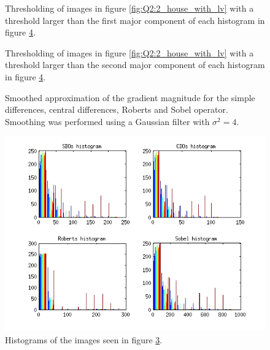 \begin{figure}[H]
	\centering
	\scalebox{0.9}{}
	\caption{Thresholding of images in figure \ref{fig:Q2:2_house_with_lv} with a threshold larger than the first major component of
	each histogram in figure \ref{fig:Q2:histogram_house_with_lv}.}
	\label{fig:Q2:threshold_house_1_with_lv}
\end{figure}

\begin{figure}[H]
	\centering
	\scalebox{0.9}{}
	\caption{Thresholding of images in figure \ref{fig:Q2:2_house_with_lv} with a threshold larger than the second major component of
	each histogram in figure \ref{fig:Q2:histogram_house_with_lv}.}
	\label{fig:Q2:threshold_house_2_with_lv}
\end{figure}


\begin{figure}[H]
	\centering
	\scalebox{0.7}{}
	\caption{Smoothed approximation of the gradient magnitude for the simple differences, central differences, Roberts and Sobel operator. Smoothing
	was performed using a Gaussian filter with $\sigma^2 = 4$.}
	\label{fig:Q2:2_house_smoothed_with_lv}
\end{figure}

\begin{figure}[H]
	\centering
	\includegraphics[scale=0.8]{./images/Q2/with_lv/house_smoothed/histogram_2.png}
	\caption{Histograms of the images seen in figure \ref{fig:Q2:2_house_smoothed_with_lv}.}
	\label{fig:Q2:histogram_house_with_lv}
\end{figure}



